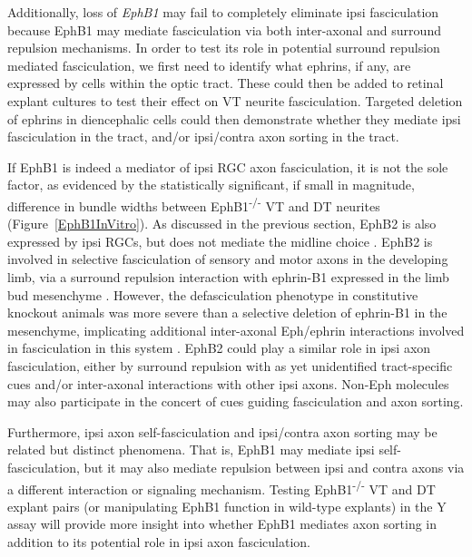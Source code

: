 Additionally, loss of \emph{EphB1} may fail to completely eliminate ipsi fasciculation \invitro{} because EphB1 may mediate fasciculation via both inter-axonal and surround repulsion mechanisms.
In order to test its role in potential surround repulsion mediated fasciculation, we first need to identify what ephrins, if any, are expressed by cells within the optic tract.
These could then be added to retinal explant cultures to test their effect on VT neurite fasciculation.
Targeted deletion of ephrins in diencephalic cells \invivo{} could then demonstrate whether they mediate ipsi fasciculation in the tract, and/or ipsi/contra axon sorting in the tract.

If EphB1 is indeed a mediator of ipsi RGC axon fasciculation, it is not the sole factor, as evidenced by the statistically significant, if small in magnitude, difference in bundle widths between EphB1\textsuperscript{-/-} VT and DT neurites (Figure~\ref{EphB1InVitro}).
As discussed in the previous section, EphB2 is also expressed by ipsi RGCs, but does not mediate the midline choice \cite{williams2003ephrin,chenaux2011forward}.
EphB2 is involved in selective fasciculation of sensory and motor axons in the developing limb, via a surround repulsion interaction with ephrin-B1 expressed in the limb bud mesenchyme \cite{luxey2013eph}.
However, the defasciculation phenotype in constitutive knockout animals was more severe than a selective deletion of ephrin-B1 in the mesenchyme, implicating additional inter-axonal Eph/ephrin interactions involved in fasciculation in this system \cite{luxey2013eph}.
EphB2 could play a similar role in ipsi axon fasciculation, either by surround repulsion with as yet unidentified tract-specific cues and/or inter-axonal interactions with other ipsi axons.
Non-Eph molecules may also participate in the concert of cues guiding fasciculation and axon sorting.

Furthermore, ipsi axon self-fasciculation and ipsi/contra axon sorting may be related but distinct phenomena.
That is, EphB1 may mediate ipsi self-fasciculation, but it may also mediate repulsion between ipsi and contra axons via a different interaction or signaling mechanism.
Testing EphB1\textsuperscript{-/-} VT and DT explant pairs (or manipulating EphB1 function in wild-type explants) in the Y assay will provide more insight into whether EphB1 mediates axon sorting in addition to its potential role in ipsi axon fasciculation.
